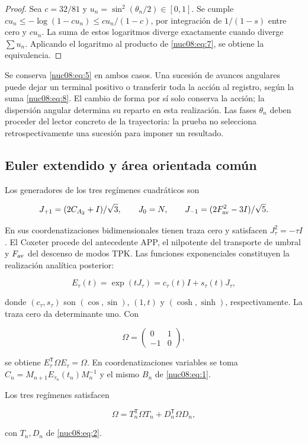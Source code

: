 \begin{proof}
Sea \(c=32/81\) y \(u_n=\sin^2(\theta_n/2)\in[0,1]\). Se cumple
\(cu_n\leq-\log(1-cu_n)\leq cu_n/(1-c)\), por integración de \(1/(1-s)\) entre cero y \(cu_n\). La suma de estos logaritmos diverge exactamente cuando diverge \(\sum u_n\). Aplicando el logaritmo al producto de \eqref{nuc08:eq:7}, se obtiene la equivalencia.
\end{proof}

Se conserva \eqref{nuc08:eq:5} en ambos casos. Una sucesión de avances angulares puede dejar un terminal positivo o transferir toda la acción al registro, según la suma \eqref{nuc08:eq:8}. El cambio de forma por sí solo conserva la acción; la dispersión angular determina su reparto en esta realización. Las fases \(\theta_n\) deben proceder del lector concreto de la trayectoria: la prueba no selecciona retrospectivamente una sucesión para imponer un resultado.

\subsection{Euler extendido y área orientada común}

Los generadores de los tres regímenes cuadráticos son

\[
J_{+1}=(2C_{A_2}+I)/\sqrt3,\qquad
J_0=N,\qquad
J_{-1}=(2F_{\rm av}^2-3I)/\sqrt5.
\]

En sus coordenatizaciones bidimensionales tienen traza cero y satisfacen
\(J_\tau^2=-\tau I\). El Coxeter procede del antecedente APP, el nilpotente del transporte de umbral y \(F_{\rm av}\) del descenso de modos TPK. Las funciones exponenciales constituyen la realización analítica posterior:

\[
E_\tau(t)=\exp(tJ_\tau)=c_\tau(t)I+s_\tau(t)J_\tau,
\]

donde \((c_\tau,s_\tau)\) son \((\cos,\sin)\), \((1,t)\) y \((\cosh,\sinh)\), respectivamente. La traza cero da determinante uno. Con

\[
\Omega=\begin{pmatrix}0&1\\-1&0\end{pmatrix},
\]

se obtiene \(E_\tau^\mathsf T\Omega E_\tau=\Omega\). En coordenatizaciones variables se toma
\(C_n=M_{n+1}E_{\tau_n}(t_n)M_n^{-1}\) y el mismo \(B_n\) de \eqref{nuc08:eq:1}.

\begin{theorem}
Los tres regímenes satisfacen

\begin{equation}
\boxed{\Omega=T_n^\mathsf T\Omega T_n+D_n^\mathsf T\Omega D_n,}
\label{nuc08:eq:9}
\end{equation}

con \(T_n,D_n\) de \eqref{nuc08:eq:2}.
\end{theorem}

